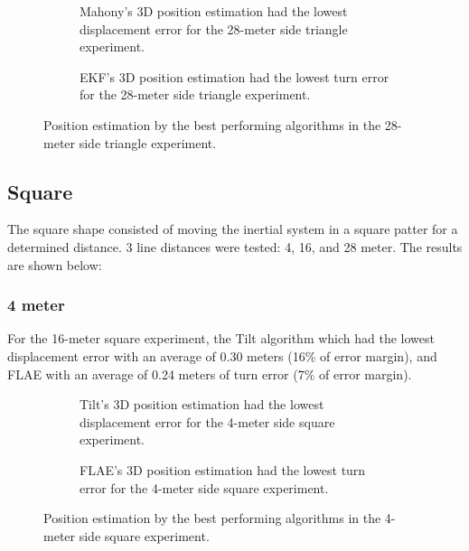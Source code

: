 \begin{figure}[H]
    \centering
    \begin{subfigure}{0.49\textwidth}
        \centering
        \resizebox{1\linewidth}{!}{}
        \caption{Mahony's 3D position estimation had the lowest displacement error for the 28-meter side triangle experiment.}
        \label{fig:triangle28_2D}
    \end{subfigure}
    \begin{subfigure}{0.49\textwidth}
        \centering
        \resizebox{1\linewidth}{!}{}
        \caption{EKF's 3D position estimation had the lowest turn error for the 28-meter side triangle experiment.}
        \label{fig:triangle28_3D}
    \end{subfigure}
    \caption{Position estimation by the best performing algorithms in the 28-meter side triangle experiment.}
    \label{fig:triangle28}
\end{figure}

\subsection{Square}

The square shape consisted of moving the inertial system in a square patter for a determined distance. 3 line distances were tested: 4, 16, and 28 meter. The results are shown below:

\subsubsection{4 meter}

For the 16-meter square experiment, the Tilt algorithm which had the lowest displacement error with an average of 0.30 meters (16\% of error margin), and FLAE with an average of 0.24 meters of turn error (7\% of error margin).

\vspace{-0.5cm}

\vspace{-1.5cm}

\begin{figure}[H]
    \centering
    \begin{subfigure}{0.49\textwidth}
        \centering
        \resizebox{1\linewidth}{!}{}
        \caption{Tilt's 3D position estimation had the lowest displacement error for the 4-meter side square experiment.}

        \label{fig:square42D}
    \end{subfigure}
    \begin{subfigure}{0.49\textwidth}
        \centering
        \resizebox{1\linewidth}{!}{}
        \caption{FLAE's 3D position estimation had the lowest turn error for the 4-meter  side square experiment.}
        \label{fig:square43D}
    \end{subfigure}
    \caption{Position estimation by the best performing algorithms in the 4-meter side square experiment.}
    \label{fig:square4}
\end{figure}

